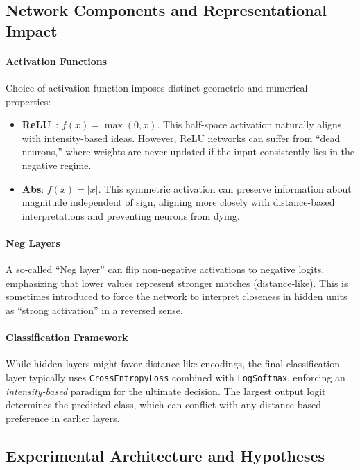 \subsection{Network Components and Representational Impact}

\paragraph{Activation Functions}
Choice of activation function imposes distinct geometric and numerical properties:
\begin{itemize}
    \item \textbf{ReLU}~\cite{nair2010rectified}: $f(x) = \max(0, x)$. This half-space activation naturally aligns with intensity-based ideas. However, ReLU networks can suffer from ``dead neurons,'' where weights are never updated if the input consistently lies in the negative regime.
    \item \textbf{Abs}: $f(x) = |x|$. This symmetric activation can preserve information about magnitude independent of sign, aligning more closely with distance-based interpretations and preventing neurons from dying.
\end{itemize}

\paragraph{Neg Layers}
A so-called ``Neg layer'' can flip non-negative activations to negative logits, emphasizing that lower values represent stronger matches (distance-like). This is sometimes introduced to force the network to interpret closeness in hidden units as ``strong activation'' in a reversed sense.

\paragraph{Classification Framework}
While hidden layers might favor distance-like encodings, the final classification layer typically uses \texttt{CrossEntropyLoss} combined with \texttt{LogSoftmax}, enforcing an \emph{intensity-based} paradigm for the ultimate decision. The largest output logit determines the predicted class, which can conflict with any distance-based preference in earlier layers.

\subsection{Experimental Architecture and Hypotheses}

